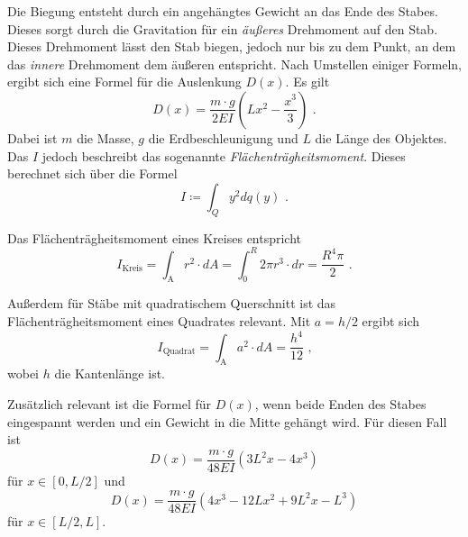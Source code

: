 Die Biegung entsteht durch ein angehängtes Gewicht an das Ende des Stabes.
Dieses sorgt durch die Gravitation für ein \textit{äußeres} Drehmoment auf den Stab.
Dieses Drehmoment lässt den Stab biegen, jedoch nur bis zu dem Punkt, an dem das \textit{innere} Drehmoment dem äußeren entspricht.
Nach Umstellen einiger Formeln, ergibt sich eine Formel für die Auslenkung $D(x)$.
Es gilt
\begin{equation} \label{eq:E1}
        D(x) = \frac{m \cdot g}{2 E I} (Lx^2 - \frac{x^3}{3}) \text{ .}
\end{equation}
Dabei ist $m$ die Masse, $g$ die Erdbeschleunigung und $L$ die Länge des Objektes.
Das $I$ jedoch beschreibt das sogenannte \textit{Flächenträgheitsmoment}.
Dieses berechnet sich über die Formel
\begin{equation}
        I \coloneq \int_Q y^2 dq(y) \text{ .}
\end{equation}

Das Flächenträgheitsmoment eines Kreises entspricht
\begin{equation}\label{eq:FlTreagKreis}
        I_\text{Kreis} = \int_\text{A} r^2 \cdot dA = \int_0^R 2 \pi r^3 \cdot dr = \frac{R^4 \pi}{2}\text{ .}
\end{equation}

Außerdem für Stäbe mit quadratischem Querschnitt ist das Flächenträgheitsmoment eines Quadrates relevant.
Mit $a = h / 2$ ergibt sich
\begin{equation}\label{eq:FlTreagQuadrat}
        I_\text{Quadrat} = \int_\text{A} a^2 \cdot dA = \frac{h^4} {12} \text{ ,}
\end{equation}
wobei $h$ die Kantenlänge ist.%

Zusätzlich relevant ist die Formel für $D(x)$, wenn beide Enden des Stabes eingespannt werden und
ein Gewicht in die Mitte gehängt wird.
Für diesen Fall ist
\begin{equation} \label{eq:E2}
        D(x) = \frac{m \cdot g}{48 E I} (3L^2x - 4 x^3)
\end{equation}
für $ x \in [0,L/2]$ und
\begin{equation} \label{eq:E3}
        D(x) = \frac{m \cdot g}{48 E I} (4x^3 - 12Lx^2+9L^2x-L^3)
\end{equation}
für $ x \in [L/2,L]$.